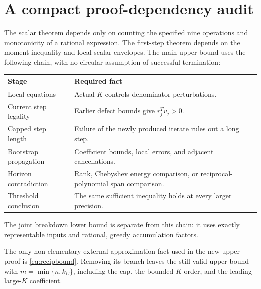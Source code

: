 \documentclass[11pt]{article}
\theoremstyle{remark}\newtheorem{remark}[theorem]{Remark}
\begin{document}
\appendix
\section{A compact proof-dependency audit}

The scalar theorem depends only on counting the specified nine operations
and monotonicity of a rational expression. The first-step theorem depends
on the moment inequality and local scalar envelopes. The main upper bound
uses the following chain, with no circular assumption of successful
termination:
\begin{center}
\begin{tabular}{p{}p{}}
\toprule
Stage & Required fact\\
\midrule
Local equations & Actual $K$ controls denominator perturbations.\\
Current step legality & Earlier defect bounds give $r_j^Tv_j>0$.\\
Capped step length & Failure of the newly produced iterate rules out a long step.\\
Bootstrap propagation & Coefficient bounds, local errors, and adjacent cancellations.\\
Horizon contradiction & Rank, Chebyshev energy comparison, or reciprocal-polynomial span comparison.\\
Threshold conclusion & The same sufficient inequality holds at every larger precision.\\
\bottomrule
\end{tabular}
\end{center}
The joint breakdown lower bound is separate from this chain: it uses
exactly representable inputs and rational, greedy accumulation factors.

The only non-elementary external approximation fact used in the new upper
proof is \eqref{eq:recipbound}. Removing its branch leaves the still-valid
upper bound with $m=\min\{n,k_C\}$, including the cap, the bounded-$K$
order, and the leading large-$K$ coefficient.
\end{document}

